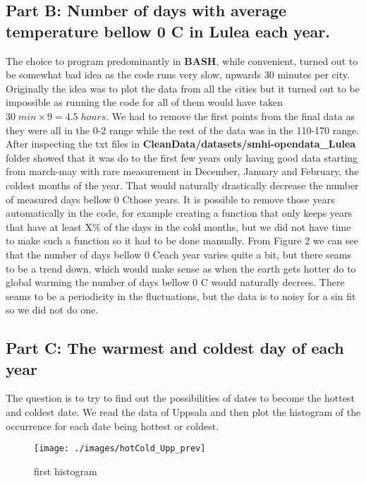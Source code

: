\documentclass[a4paper]{article}
\begin{document}
\subsection{Part B: Number of days with average temperature bellow 0 C \degree in Lulea each
year.}
The choice to program predominantly in \textbf{BASH}, while convenient, turned out to be somewhat bad idea as the code runs very slow, upwards 30 minutes per city. Originally the idea was to plot the data from all the cities but it turned out to be impossible as running the code for all of them would have taken $30\; min \times 9=4.5\; hours$.
\newline
\newline
We had to remove the first points from the final data as they were all in the 0-2 range while the rest of the data was in the 110-170 range. After inspecting the txt files in \textbf{CleanData/datasets/smhi-opendata\_Lulea} folder showed that it was do to the first few years only having good data starting from march-may with rare measurement in December, January and February, the coldest months of the year. That would naturally drastically decrease the number of measured days bellow 0 C\degree those years. It is possible to remove those years automatically in the code, for example creating a function that only keeps years that have at least X\% of the days in the cold months, but we did not have time to make such a function so it had to be done manually.
\newline
\newline{}
From Figure 2 we can see that the number of days bellow 0 C\degree each year varies quite a bit, but there seams to be a trend down, which would make sense as when the earth gets hotter do to global warming the number of days bellow 0 C \degree would naturally decrees. There seams to be a periodicity in the fluctuations, but the data is to noisy for a sin fit so we did not do one.
\subsection{Part C: The warmest and coldest day of each year}

The question is to try to find out the possibilities of dates to become the hottest and coldest date. We read the data of Uppsala and then plot the histogram of the occurrence for each date being hottest or coldest. 

\begin{figure}[htp]
    \centering
    \texttt{[image: ./images/hotCold\_Upp\_prev]}
    \caption{first histogram}
    \label{fig:hist}
\end{figure}
\end{document}
